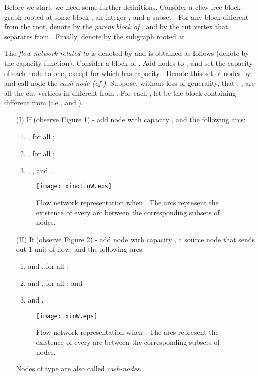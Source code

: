 \documentclass{llncs}
\begin{document}
Before we start, we need some further definitions. Consider a claw-free block graph  rooted at some block , an integer , and a subset . For any block  different from the root, denote by  the \emph{parent block of }, and by  the cut vertex that separates  from . Finally, denote by  the subgraph rooted at . 

The \emph{flow network related to } is denoted by  and is obtained as follows (denote by  the capacity function). Consider a block  of . Add nodes  to , and set the capacity of each node to one, except for  which has capacity . Denote this set of nodes by  and call node  the \emph{cash-node (of )}. Suppose, without loss of generality, that , , are all the cut vertices in  different from . For each , let  be the block containing  different from  (i.e.,  and ). \begin{itemize}
 \item[(I)] If  (observe Figure \ref{xnotinW}) - add node  with capacity , and the following arcs:\begin{enumerate}
  \item , for all ; 
  \item , for all ; 
  \item , , and .
 \end{enumerate}

 \begin{figure}\label{xnotinW}
\begin{center}
\texttt{[image: xinotinW.eps]} 
\end{center}
\caption{Flow network representation when . The arcs represent the existence of every arc between the corresponding subsets of nodes.}
\end{figure}

   
 \item[(II)] If  (observe Figure \ref{xinW}) - add node  with capacity , a source node  that sends out 1 unit of flow, and the following arcs:
 \begin{enumerate}
  \item  and , for all ;
  \item  and , for all ; and
  \item  and .
 \end{enumerate}
 
 \begin{figure}\label{xinW}
\begin{center}
\texttt{[image: xinW.eps]}
\end{center}
\caption{Flow network representation when . The arcs represent the existence of every arc between the corresponding subsets of nodes.}
\end{figure}

\item[] Nodes of type  are also called \emph{cash-nodes}.
\end{itemize}
\end{document}
